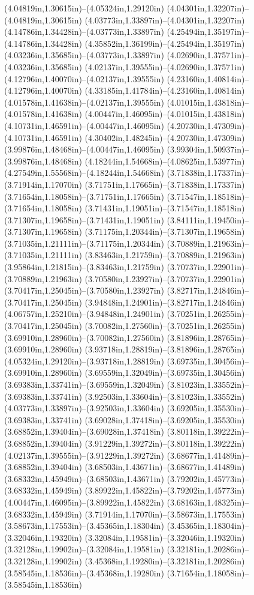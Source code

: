 (4.04819in,1.30615in)--(4.05324in,1.29120in) (4.04301in,1.32207in)--(4.04819in,1.30615in) (4.03773in,1.33897in)--(4.04301in,1.32207in) (4.14786in,1.34428in)--(4.03773in,1.33897in) (4.25494in,1.35197in)--(4.14786in,1.34428in) (4.35852in,1.36199in)--(4.25494in,1.35197in) (4.03236in,1.35685in)--(4.03773in,1.33897in) (4.02690in,1.37571in)--(4.03236in,1.35685in) (4.02137in,1.39555in)--(4.02690in,1.37571in) (4.12796in,1.40070in)--(4.02137in,1.39555in) (4.23160in,1.40814in)--(4.12796in,1.40070in) (4.33185in,1.41784in)--(4.23160in,1.40814in) (4.01578in,1.41638in)--(4.02137in,1.39555in) (4.01015in,1.43818in)--(4.01578in,1.41638in) (4.00447in,1.46095in)--(4.01015in,1.43818in) (4.10731in,1.46591in)--(4.00447in,1.46095in) (4.20730in,1.47309in)--(4.10731in,1.46591in) (4.30402in,1.48245in)--(4.20730in,1.47309in) (3.99876in,1.48468in)--(4.00447in,1.46095in) (3.99304in,1.50937in)--(3.99876in,1.48468in) (4.18244in,1.54668in)--(4.08625in,1.53977in) (4.27549in,1.55568in)--(4.18244in,1.54668in) (3.71838in,1.17337in)--(3.71914in,1.17070in) (3.71751in,1.17665in)--(3.71838in,1.17337in) (3.71654in,1.18058in)--(3.71751in,1.17665in) (3.71547in,1.18518in)--(3.71654in,1.18058in) (3.71431in,1.19051in)--(3.71547in,1.18518in) (3.71307in,1.19658in)--(3.71431in,1.19051in) (3.84111in,1.19450in)--(3.71307in,1.19658in) (3.71175in,1.20344in)--(3.71307in,1.19658in) (3.71035in,1.21111in)--(3.71175in,1.20344in) (3.70889in,1.21963in)--(3.71035in,1.21111in) (3.83463in,1.21759in)--(3.70889in,1.21963in) (3.95864in,1.21815in)--(3.83463in,1.21759in) (3.70737in,1.22901in)--(3.70889in,1.21963in) (3.70580in,1.23927in)--(3.70737in,1.22901in) (3.70417in,1.25045in)--(3.70580in,1.23927in) (3.82717in,1.24846in)--(3.70417in,1.25045in) (3.94848in,1.24901in)--(3.82717in,1.24846in) (4.06757in,1.25210in)--(3.94848in,1.24901in) (3.70251in,1.26255in)--(3.70417in,1.25045in) (3.70082in,1.27560in)--(3.70251in,1.26255in) (3.69910in,1.28960in)--(3.70082in,1.27560in) (3.81896in,1.28765in)--(3.69910in,1.28960in) (3.93718in,1.28819in)--(3.81896in,1.28765in) (4.05324in,1.29120in)--(3.93718in,1.28819in) (3.69735in,1.30456in)--(3.69910in,1.28960in) (3.69559in,1.32049in)--(3.69735in,1.30456in) (3.69383in,1.33741in)--(3.69559in,1.32049in) (3.81023in,1.33552in)--(3.69383in,1.33741in) (3.92503in,1.33604in)--(3.81023in,1.33552in) (4.03773in,1.33897in)--(3.92503in,1.33604in) (3.69205in,1.35530in)--(3.69383in,1.33741in) (3.69028in,1.37418in)--(3.69205in,1.35530in) (3.68852in,1.39404in)--(3.69028in,1.37418in) (3.80118in,1.39222in)--(3.68852in,1.39404in) (3.91229in,1.39272in)--(3.80118in,1.39222in) (4.02137in,1.39555in)--(3.91229in,1.39272in) (3.68677in,1.41489in)--(3.68852in,1.39404in) (3.68503in,1.43671in)--(3.68677in,1.41489in) (3.68332in,1.45949in)--(3.68503in,1.43671in) (3.79202in,1.45773in)--(3.68332in,1.45949in) (3.89922in,1.45822in)--(3.79202in,1.45773in) (4.00447in,1.46095in)--(3.89922in,1.45822in) (3.68163in,1.48325in)--(3.68332in,1.45949in) (3.71914in,1.17070in)--(3.58673in,1.17553in) (3.58673in,1.17553in)--(3.45365in,1.18304in) (3.45365in,1.18304in)--(3.32046in,1.19320in) (3.32084in,1.19581in)--(3.32046in,1.19320in) (3.32128in,1.19902in)--(3.32084in,1.19581in) (3.32181in,1.20286in)--(3.32128in,1.19902in) (3.45368in,1.19280in)--(3.32181in,1.20286in) (3.58545in,1.18536in)--(3.45368in,1.19280in) (3.71654in,1.18058in)--(3.58545in,1.18536in) 